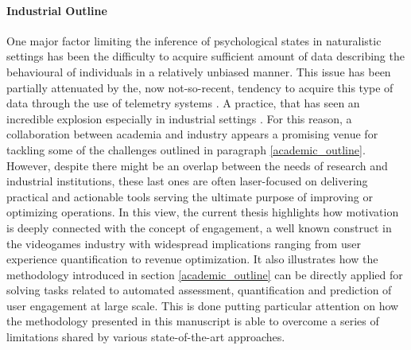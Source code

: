 \paragraph*{Industrial Outline}
\label{industrial_outline}
One major factor limiting the inference of psychological states in naturalistic settings has been the difficulty to acquire sufficient amount of data describing the behavioural of individuals in a relatively unbiased manner. This issue has been partially attenuated by the, now not-so-recent, tendency to acquire this type of data through the use of telemetry systems \cite{el2016game, drachen2015behavioral}. A practice, that has seen an incredible explosion especially in industrial settings \cite{el2016game, drachen2015behavioral,EUdataregulations2018}. For this reason, a collaboration between academia and industry appears a promising venue for tackling some of the challenges outlined in paragraph \ref{academic_outline}. However, despite there might be an overlap between the needs of research and industrial institutions, these last ones are often laser-focused on delivering practical and actionable tools serving the ultimate purpose of improving or optimizing operations. In this view, the current thesis highlights how motivation is deeply connected with the concept of engagement, a well known construct in the videogames industry with widespread implications ranging from user experience quantification to revenue optimization. It also illustrates how the methodology introduced in section \ref{academic_outline} can be directly applied for solving tasks related to automated assessment, quantification and prediction of user engagement at large scale. This is done putting particular attention on how the methodology presented in this manuscript is able to overcome a series of limitations shared by various state-of-the-art approaches. 

